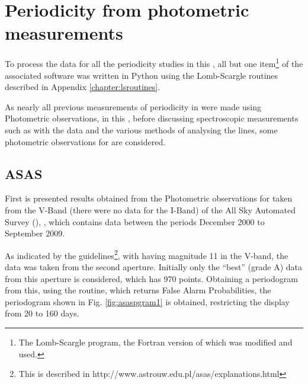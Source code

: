 \chapter{Periodicity from photometric measurements} %
\protect\label{chapter:photometry}

To process the data for all the periodicity studies in this \paperorthesis, all but one item\footnote{The {\numrecs}
  Lomb-Scargle program, the Fortran version of which was modified and used.} of the associated software was written in
Python using the Lomb-Scargle routines described in Appendix \ref{chapter:lsroutines}.

As nearly all previous measurements of periodicity in {\prox} were made using Photometric observations, in this
{\paperorthesis}, before discussing spectroscopic measurements such as with the {\harps} data and the various methods of
analysing the {\ha} lines, some photometric observations for {\prox} are considered.

\section{ASAS}
\protect\label{section:asas}

First is presented results obtained from the Photometric observations for {\prox} taken from the V-Band (there were no
data for the I-Band) of the All Sky Automated Survey (\asas), \citep{pojmanski97}, which contains data between the
periods December 2000 to September 2009.

As indicated by the {\asas} guidelines\footnote{This is described in http://www.astrouw.edu.pl/asas/explanations.html},
with {\prox} having magnitude 11 in the V-band, the data was taken from the second aperture. Initially only the ``best''
(grade A) data from this aperture is considered, which has 970 points. Obtaining a periodogram from this, using the
{\numrecs} routine, which returns False Alarm Probabilities, the periodogram shown in Fig. \ref{fig:asaspgram1} is
obtained, restricting the display from 20 to 160 days.

